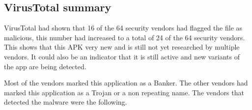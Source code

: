 \subsection{VirusTotal summary}

VirusTotal had shown that 16 of the 64 security vendors had flagged the file as malicious, 
this number had increased to a total of 24 of the 64 security vendors. 
This shows that this APK very new and is still not yet researched by multiple vendors. 
It could also be an indicator that it is still active and new variants of the app are being detected. 

Most of the vendors marked this application as a Banker. 
The other vendors had marked this application as a Trojan or a non repeating name.
The vendors that detected the malware were the following.

